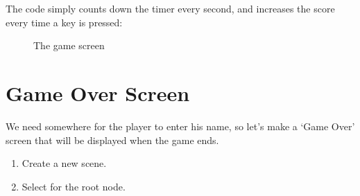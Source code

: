 \documentclass[a4paper,12pt,english]{sphinxmanual}
\begin{document}
\sphinxAtStartPar
The code simply counts down the timer every second, and increases the
score every time a key is pressed:

\begin{sphinxVerbatim}[commandchars=\\\{\}]
   
   

 
      
      
      

 
          
          
          
            
\end{sphinxVerbatim}

\begin{figure}[htbp]
\centering
\capstart

\noindent{}
\caption{The game screen}\label{\detokenize{tutorial:id4}}\end{figure}


\section{Game Over Screen}
\label{\detokenize{tutorial:game-over-screen}}
\sphinxAtStartPar
We need somewhere for the player to enter his name, so let’s make a
‘Game Over’ screen that will be displayed when the game ends.
\begin{enumerate}
%
\item {} 
\sphinxAtStartPar
Create a new scene. 

\item {} 
\sphinxAtStartPar
Select  for the root node.

\end{enumerate}
\end{document}
